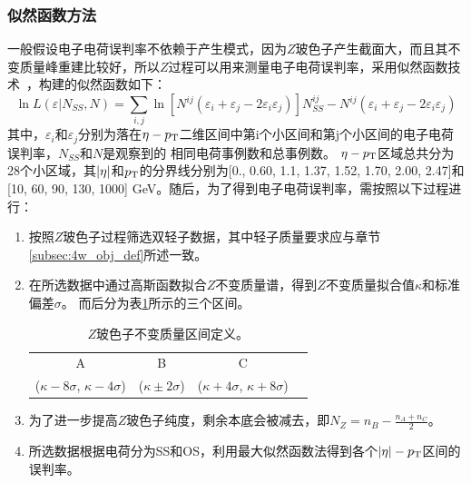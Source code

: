 \subsubsection{似然函数方法}
一般假设电子电荷误判率不依赖于产生模式，因为$Z$玻色子产生截面大，而且其不变质量峰重建比较好，所以$Z$过程可以用来测量电子电荷误判率，采用似然函数技术~\cite{Likelihoodnote}，构建的似然函数如下：
\begin{equation}
\ln L(\varepsilon|N_{SS},N)=\sum_{i,j}\ln [N^{ij}(\varepsilon_i+\varepsilon_j-2\varepsilon_i \varepsilon_j)]N^{ij}_{SS}-N^{ij}(\varepsilon_i+\varepsilon_j-2\varepsilon_i \varepsilon_j)
\end{equation}
其中，$\varepsilon_i$和$\varepsilon_j$分别为落在$\eta-p_{\text{T}}$二维区间中第i个小区间和第j个小区间的电子电荷误判率，$N_{SS}$和$N$是观察到的
相同电荷事例数和总事例数。
$\eta-p_{\text{T}}$区域总共分为28个小区域，其$|\eta|$和$p_{\text{T}}$的分界线分别为[0., 0.60, 1.1, 1.37, 1.52, 1.70, 2.00, 2.47]和
[10, 60, 90, 130, 1000] GeV。随后，为了得到电子电荷误判率，需按照以下过程进行：
\begin{enumerate}
 \item 按照$Z$玻色子过程筛选双轻子数据，其中轻子质量要求应与章节\ref{subsec:4w_obj_def}所述一致。
 \item 在所选数据中通过高斯函数拟合$Z$不变质量谱，得到$Z$不变质量拟合值$\kappa$和标准偏差$\sigma$。
而后分为表\ref{tab:QmisID_Z_control}所示的三个区间。
\begin{table}[h]
\centering
\begin{tabular}{cccc}
\hline
  A  &B  &C  \\
($\kappa-8\sigma$, $\kappa - 4\sigma$)  & ($\kappa \pm 2\sigma$)  & ($\kappa+4\sigma$, $\kappa + 8\sigma$) \\
\hline
\end{tabular}
\caption{$Z$玻色子不变质量区间定义。}
\label{tab:QmisID_Z_control}
\end{table}

 \item 为了进一步提高$Z$玻色子纯度，剩余本底会被减去，即$N_Z=n_B-\frac{n_A+n_C}{2}$。
 \item 所选数据根据电荷分为SS和OS，利用最大似然函数法得到各个$|\eta|-p_{\text{T}}$区间的误判率。
\end{enumerate}

